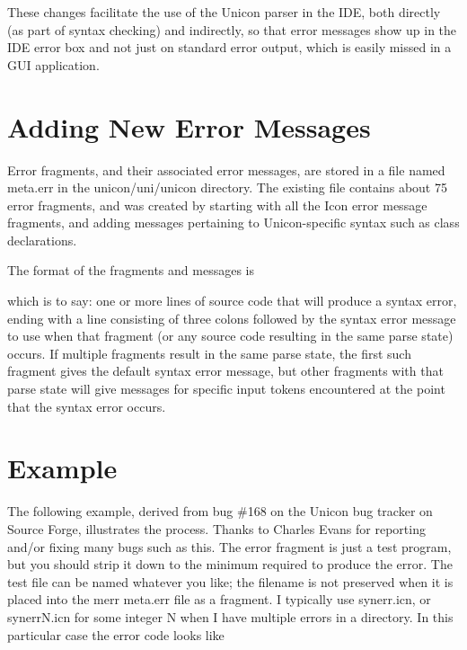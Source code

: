 \documentclass[letterpaper]{article}
\begin{document}
These changes facilitate the use of the Unicon parser in the IDE, both
directly (as part of syntax checking) and indirectly, so that error
messages show up in the IDE error box and not just on standard error
output, which is easily missed in a GUI application.

\section{Adding New Error Messages}

Error fragments, and their associated error messages, are stored in a
file named meta.err in the unicon/uni/unicon directory.  The existing
file contains about 75 error fragments, and was created by starting
with all the Icon error message fragments, and adding messages
pertaining to Unicon-specific syntax such as class declarations.

The format of the fragments and messages is


\noindent which is to say: one or more lines of source code that will
produce a syntax error, ending with a line consisting of three colons
followed by the syntax error message to use when that fragment (or any
source code resulting in the same parse state) occurs.  If multiple
fragments result in the same parse state, the first such fragment
gives the default syntax error message, but other fragments with that
parse state will give messages for specific input tokens encountered
at the point that the syntax error occurs.

\section{Example}

The following example, derived from bug \#168 on the Unicon bug
tracker on Source Forge, illustrates the process. Thanks to Charles
Evans for reporting and/or fixing many bugs such as this.  The error
fragment is just a test program, but you should strip it down to the
minimum required to produce the error. The test file can be named
whatever you like; the filename is not preserved when it is placed
into the merr meta.err file as a fragment. I typically use synerr.icn,
or synerrN.icn for some integer N when I have multiple errors in a
directory.  In this particular case the error code looks like

\end{document}
